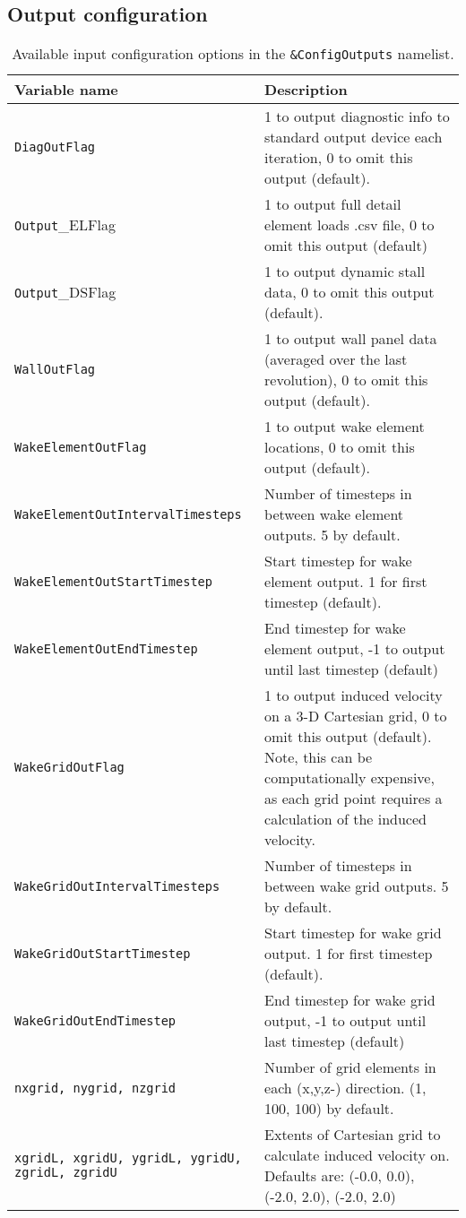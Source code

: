 \subsection{Output configuration}
\begin{longtable}{p{}p{}}
\caption{Available input configuration options in the \texttt{\&ConfigOutputs} namelist.} \label{tbl:configoutputs} \\
\toprule
Variable name & Description \\ \midrule
\texttt{DiagOutFlag}                     & 1 to output diagnostic info to standard output device each iteration, 0 to omit this output (default). \\
\texttt{Output}\_ELFlag                  & 1 to output full detail element loads .csv file, 0 to omit this output (default) \\
\texttt{Output}\_DSFlag                  & 1 to output dynamic stall data, 0 to omit this output (default). \\
\texttt{WallOutFlag}                     & 1 to output wall panel data (averaged over the last revolution), 0 to omit this output (default). \\
\texttt{WakeElementOutFlag}              & 1 to output wake element locations, 0 to omit this output (default). \\
\texttt{WakeElementOutIntervalTimesteps} & Number of timesteps in between wake element outputs. 5 by default. \\
\texttt{WakeElementOutStartTimestep}     & Start timestep for wake element output. 1 for first timestep (default). \\
\texttt{WakeElementOutEndTimestep}       & End timestep for wake element output, -1 to output until last timestep (default) \\
\texttt{WakeGridOutFlag}                 & 1 to output induced velocity on a 3-D Cartesian grid, 0 to omit this output (default). Note, this can be computationally expensive, as each grid point requires a calculation of the induced velocity. \\
\texttt{WakeGridOutIntervalTimesteps}    & Number of timesteps in between wake grid outputs. 5 by default. \\
\texttt{WakeGridOutStartTimestep}        & Start timestep for wake grid output. 1 for first timestep (default). \\
\texttt{WakeGridOutEndTimestep}          & End timestep for wake grid output, -1 to output until last timestep (default) \\
\texttt{nxgrid, nygrid, nzgrid}          & Number of grid elements in each (x,y,z-) direction. (1, 100, 100) by default. \\
\texttt{xgridL, xgridU, ygridL, ygridU, zgridL, zgridU}                 & Extents of Cartesian grid to calculate induced velocity on. Defaults are: (-0.0, 0.0), (-2.0, 2.0), (-2.0, 2.0) \\
\bottomrule
\end{longtable}

